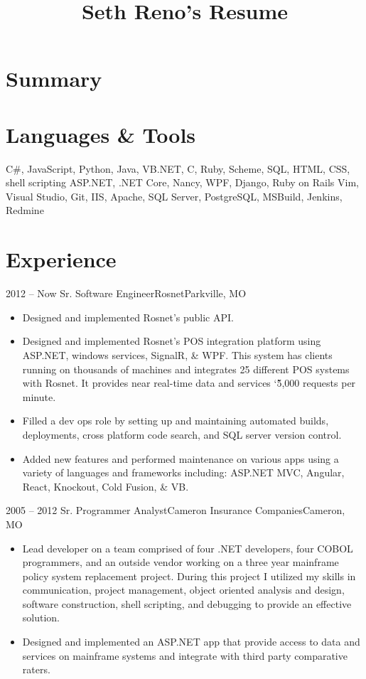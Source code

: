 \documentclass[11pt,letterpaper,final]{moderncv}
\title{Seth Reno's Resume}
\begin{document}
\maketitle
\section{Summary}

\section{Languages \& Tools} 
{C\#, JavaScript, Python, Java, VB.NET, C, Ruby, Scheme, SQL, HTML, CSS, shell scripting}
{ASP.NET, .NET Core, Nancy, WPF, Django, Ruby on Rails}
{Vim, Visual Studio, Git, IIS, Apache, SQL Server, PostgreSQL, MSBuild, Jenkins, Redmine}

\section{Experience} 
	\cventry
{2012 -- Now} {Sr. Software Engineer}{Rosnet}{Parkville, MO}{}{
		\begin{itemize}
			\item
				Designed and implemented Rosnet's public API.
			\item
				Designed and implemented Rosnet's POS integration
				platform using ASP.NET, windows services, SignalR, \&
				WPF. This system has clients running on thousands of
				machines and integrates 25 different POS systems with
				Rosnet. It provides near real-time data and services
				\char`\~5,000 requests per minute.
			\item
				Filled a dev ops role by setting up and maintaining
				automated builds, deployments, cross platform code
				search, and SQL server version control.
			\item
				Added new features and performed maintenance on various
				apps using a variety of languages and frameworks
				including: ASP.NET MVC, Angular, React, Knockout, Cold
				Fusion, \& VB.
		\end{itemize}
}
	\cventry
{2005 -- 2012} {Sr. Programmer Analyst}{Cameron Insurance Companies}{Cameron, MO}{}{
		\begin{itemize}
			\item 
				Lead developer on a team comprised of four .NET
				developers, four COBOL programmers, and an  outside
				vendor working on a three year mainframe policy system
				replacement project. During this project I utilized my
				skills in communication, project management, object
				oriented analysis and design, software construction,
				shell scripting, and debugging to provide an effective
				solution.
			\item 
				Designed and implemented an ASP.NET app that provide
				access to data and services on mainframe systems and
				integrate with third party comparative raters.
		\end{itemize}
}
\end{document}
